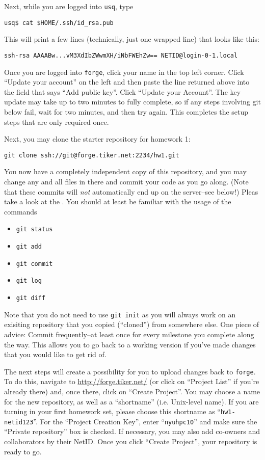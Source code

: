 \documentclass[11pt]{article}
\begin{document}
\begin{enumerate}
Next, while you are logged into \texttt{usq}, type
\begin{lstlisting}
usq$ cat $HOME/.ssh/id_rsa.pub
\end{lstlisting}
This will print a few lines (technically, just one wrapped line) that
looks like this:
\begin{lstlisting}
ssh-rsa AAAABw...vM3XdIbZWwmXH/iNbFWEhZw== NETID@login-0-1.local
\end{lstlisting}
Once you are logged into \texttt{forge}, click your name in the top
left corner. Click ``Update your account'' on the left and then paste
the line returned above into the field that says ``Add public key''.
Click ``Update your Account''. The key update may take up to two
minutes to fully complete, so if any steps involving git below fail,
wait for two minutes, and then try again.
This completes the setup steps that are only required once.

Next, you may clone the starter repository for homework 1:
\begin{lstlisting}
git clone ssh://git@forge.tiker.net:2234/hw1.git
\end{lstlisting}
You now have a completely independent copy of this repository, and you
may change any and all files in there and commit your code as you go
along. (Note that these commits will \emph{not} automatically end up
on the server--see below!) Pleas take a look at the
. You should at least be familiar with the usage of the commands
\begin{itemize}
  \item \texttt{git status}
  \item \texttt{git add}
  \item \texttt{git commit}
  \item \texttt{git log}
  \item \texttt{git diff}
\end{itemize}
Note that you do not need to use \texttt{git init} as you will always
work on an exisiting repository that you copied (``cloned'') from
somewhere else.  One piece of advice: Commit frequently--at least once
for every milestone you complete along the way. This allows you
to go back to a working version if you've made changes that you would
like to get rid of.

The next steps will create a possibility for you to upload changes
back to \texttt{forge}.  To do this, navigate to
\url{http://forge.tiker.net/} (or click on ``Project List'' if you're
already there) and, once there, click on ``Create Project''. You may
choose a name for the new repository, as well as a ``shortname'' (i.e.
Unix-level name). If you are turning in your first homework set,
please choose this shortname as ``\texttt{hw1-netid123}''.  For the
``Project Creation Key'', enter ``\texttt{nyuhpc10}'' and make sure
the ``Private repository'' box is checked. If necessary, you may also
add co-owners and collaborators by their NetID. Once you click
``Create Project'', your repository is ready to go.


\end{enumerate}
\end{document}
